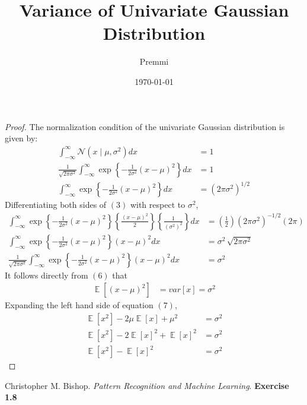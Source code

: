 \documentclass[14pt]{extarticle}
\title{Variance of Univariate Gaussian Distribution}
\author{Premmi}
\date{\today}
\DeclareMathOperator{\E}{\mathbb{E}}
\begin{document}
 
\maketitle
\begin{flushleft}	
\begin{proof} 
The normalization condition of the univariate Gaussian distribution is given by:
\begin{align}
\int_{-\infty}^{\infty}\mathcal{N}\left(\textit{x}\mid\mu, \sigma^{2}\right)dx &= 1\\
\frac{1}{\sqrt{2\pi\sigma^2}}\int_{-\infty}^{\infty} \exp\left\lbrace-\frac{1}{2\sigma^2}\left(x-\mu\right)^2\right\rbrace dx &= 1\\
\int_{-\infty}^{\infty} \exp\left\lbrace-\frac{1}{2\sigma^2}\left(x-\mu\right)^2\right\rbrace dx &= \left(2\pi\sigma^2\right)^{1/2}
\end{align}
Differentiating both sides of $(3)$ with respect to $\sigma^2$,
\begin{align}
\int_{-\infty}^{\infty} \exp\left\lbrace-\frac{1}{2\sigma^2}\left(x-\mu\right)^2\right\rbrace \left\lbrace \frac{\left(x-\mu\right)^2}{2}\right\rbrace \left\lbrace \frac{1}{\left(\sigma^2\right)^2} \right\rbrace dx &= \left(\frac{1}{2}\right) \left(2\pi\sigma^2\right)^{-1/2} \left(2\pi\right)\\
\int_{-\infty}^{\infty} \exp\left\lbrace-\frac{1}{2\sigma^2}\left(x-\mu\right)^2\right\rbrace \left(x-\mu\right)^2 dx &= \sigma^2 \, \sqrt{2\pi\sigma^2}\\
\frac{1}{\sqrt{2\pi\sigma^2}}\int_{-\infty}^{\infty} \exp\left\lbrace-\frac{1}{2\sigma^2}\left(x-\mu\right)^2\right\rbrace \left(x-\mu\right)^2 dx &= \sigma^2
\end{align}
It follows directly from $(6)$ that
\begin{align}
\E\left[\left(x-\mu\right)^2\right] &= var\left[x\right] = \sigma^2
\end{align}
Expanding the left hand side of equation $(7)$,
\begin{align*}
\E\left[x^2\right] - 2\mu\E\left[x\right] + \mu^2 &= \sigma^2\\
\E\left[x^2\right] - 2\E\left[x\right]^2 + \E\left[x\right]^2 &= \sigma^2\\
\E\left[x^2\right] - \E\left[x\right]^2 &= \sigma^2
\end{align*}
\end{proof}	
\end{flushleft}
\begin{thebibliography}{9}
Christopher M. Bishop. 
\textit{ Pattern Recognition and Machine Learning}.  
\textbf{Exercise 1.8}
\end{thebibliography}
\end{document}
